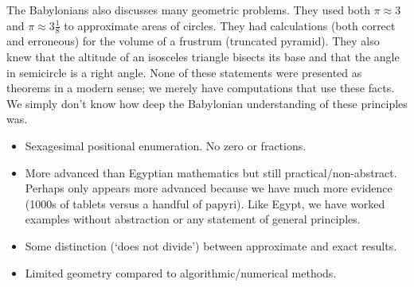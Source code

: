 
The Babylonians also discusses many geometric problems. They used both $\pi\approx 3$ and $\pi\approx 3\frac 18$ to approximate areas of circles. They had calculations (both correct and erroneous) for the volume of a frustrum (truncated pyramid). They also knew that the altitude of an isosceles triangle bisects its base and that the angle in semicircle is a right angle. None of these statements were presented as theorems in a modern sense; we merely have computations that use these facts. We simply don't know how deep the Babylonian understanding of these principles was.


\begin{itemize}
  \item Sexagesimal positional enumeration. No zero or fractions. 
  \item More advanced than Egyptian mathematics but still practical/non-abstract. Perhaps only appears more advanced because we have much more evidence (1000s of tablets versus a handful of papyri). Like Egypt, we have worked examples without abstraction or any statement of general principles.
  \item Some distinction (`does not divide') between approximate and exact results.
  \item Limited geometry compared to algorithmic/numerical methods.
\end{itemize}

\vfil\vfil\goodbreak


